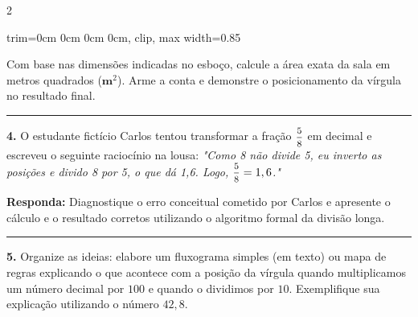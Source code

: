 \documentclass[twoside, 10pt, a4paper]{article}
\newlength{\espacoPreQuestao}\setlength{\espacoPreQuestao}{0.1cm}
\newlength{\espacoQuestao}\setlength{\espacoQuestao}{0.2cm}
\newcommand{\larguraTikz}{0.85\linewidth}
\begin{document}
\begin{multicols*}{2}
\begin{center}
\begin{adjustbox}{trim=0cm 0cm 0cm 0cm, clip, max width=\larguraTikz}
\end{adjustbox}
\end{center}
Com base nas dimensões indicadas no esboço, calcule a área exata da sala em metros quadrados ($ \textbf{m}^{2} $). Arme a conta e demonstre o posicionamento da vírgula no resultado final.
\par\vspace{\espacoQuestao}

\noindent\textcolor{CorLinha}{\rule{\linewidth}{0.5pt}} 
\par\vspace{\espacoPreQuestao}
\textbf{4.} O estudante fictício Carlos tentou transformar a fração $ \mfrac{5}{8} $ em decimal e escreveu o seguinte raciocínio na lousa: 
\textit{"Como 8 não divide 5, eu inverto as posições e divido 8 por 5, o que dá 1,6. Logo, $ \mfrac{5}{8} = 1,6 $."}
\begin{boxresponda}
\textbf{Responda:} Diagnostique o erro conceitual cometido por Carlos e apresente o cálculo e o resultado corretos utilizando o algoritmo formal da divisão longa.
\end{boxresponda}
\par\vspace{\espacoQuestao}

\noindent\textcolor{CorLinha}{\rule{\linewidth}{0.5pt}} 
\par\vspace{\espacoPreQuestao}
\textbf{5.} Organize as ideias: elabore um fluxograma simples (em texto) ou mapa de regras explicando o que acontece com a posição da vírgula quando multiplicamos um número decimal por $ 100 $ e quando o dividimos por $ 10 $. Exemplifique sua explicação utilizando o número $ 42,8 $.
\par\vspace{\espacoQuestao}


\end{multicols*}
\end{document}
